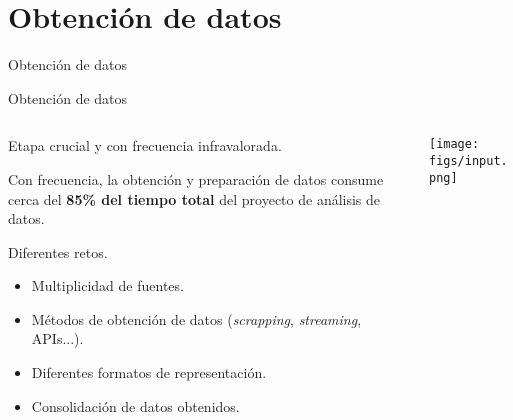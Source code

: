 \section{Obtención de datos}

\begin{frame}{}
\begin{center}
 \huge Obtención de datos
\end{center}
\end{frame}


\begin{frame}{Obtención de datos}
 \begin{columns}[T]
    \begin{column}{.7\textwidth}
  \begin{wideitemize}
  \item Etapa crucial y con frecuencia infravalorada.
  \item Con frecuencia, la obtención y preparación de datos consume cerca del
  \textbf{85\% del tiempo total} del proyecto de análisis de datos.

  \item Diferentes retos.
  \begin{itemize}
   \item Multiplicidad de fuentes.
   \item Métodos de obtención de datos (\textit{scrapping}, \textit{streaming}, APIs...).
   \item Diferentes formatos de representación.
   \item Consolidación de datos obtenidos.
  \end{itemize}

 \end{wideitemize}
    \end{column}
    \begin{column}{.30\textwidth}
    \vspace*{0.8cm}
    \texttt{[image: figs/input.png]}
    \end{column}
  \end{columns}

\end{frame}


